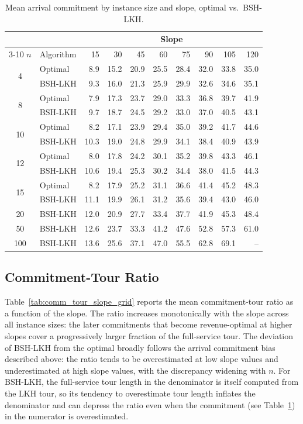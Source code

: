 \documentclass[11pt]{article}
\theoremstyle{plain}
\theoremstyle{definition}
\begin{document}
\begin{table}[t]
\centering
\small
\begin{tabular}{c l rrrrrrrr}
\toprule
& & \multicolumn{8}{c}{Slope} \\
\cmidrule(lr){3-10}
$n$ & Algorithm & 15 & 30 & 45 & 60 & 75 & 90 & 105 & 120 \\
\midrule
\multirow{2}{*}{4} & Optimal & 8.9 & 15.2 & 20.9 & 25.5 & 28.4 & 32.0 & 33.8 & 35.0 \\
 & BSH-LKH & 9.3 & 16.0 & 21.3 & 25.9 & 29.9 & 32.6 & 34.6 & 35.1 \\
\midrule
\multirow{2}{*}{8} & Optimal & 7.9 & 17.3 & 23.7 & 29.0 & 33.3 & 36.8 & 39.7 & 41.9 \\
 & BSH-LKH & 9.7 & 18.7 & 24.5 & 29.2 & 33.0 & 37.0 & 40.5 & 43.1 \\
\midrule
\multirow{2}{*}{10} & Optimal & 8.2 & 17.1 & 23.9 & 29.4 & 35.0 & 39.2 & 41.7 & 44.6 \\
 & BSH-LKH & 10.3 & 19.0 & 24.8 & 29.9 & 34.1 & 38.4 & 40.9 & 43.9 \\
\midrule
\multirow{2}{*}{12} & Optimal & 8.0 & 17.8 & 24.2 & 30.1 & 35.2 & 39.8 & 43.3 & 46.1 \\
 & BSH-LKH & 10.6 & 19.4 & 25.3 & 30.2 & 34.4 & 38.0 & 41.5 & 44.3 \\
\midrule
\multirow{2}{*}{15} & Optimal & 8.2 & 17.9 & 25.2 & 31.1 & 36.6 & 41.4 & 45.2 & 48.3 \\
 & BSH-LKH & 11.1 & 19.9 & 26.1 & 31.2 & 35.6 & 39.4 & 43.0 & 46.0 \\
\midrule
20 & BSH-LKH & 12.0 & 20.9 & 27.7 & 33.4 & 37.7 & 41.9 & 45.3 & 48.4 \\
\midrule
50 & BSH-LKH & 12.6 & 23.7 & 33.3 & 41.2 & 47.6 & 52.8 & 57.3 & 61.0 \\
\midrule
100 & BSH-LKH & 13.6 & 25.6 & 37.1 & 47.0 & 55.5 & 62.8 & 69.1 & -- \\
\bottomrule
\end{tabular}
\caption{Mean arrival commitment by instance size and slope, optimal vs.\ BSH-\ac{LKH}.}
\label{tab:commitment_slope}
\end{table}

\subsection{Commitment-Tour Ratio}
Table~\ref{tab:comm_tour_slope_grid} reports the mean commitment-tour ratio as a
function of the slope. The ratio increases monotonically with the slope across all
instance sizes: the later commitments that become revenue-optimal at higher slopes
cover a progressively larger fraction of the full-service tour. The deviation of
BSH-\ac{LKH} from the optimal broadly follows the arrival commitment bias described
above: the ratio tends to be overestimated at low slope values and underestimated at
high slope values, with the discrepancy widening with $n$. For BSH-\ac{LKH}, the
full-service tour length in the denominator is itself computed from the LKH tour,
so its tendency to overestimate tour length inflates the denominator and can depress
the ratio even when the commitment (see Table~\ref{tab:commitment_slope}) in the 
numerator is overestimated.
\end{document}
